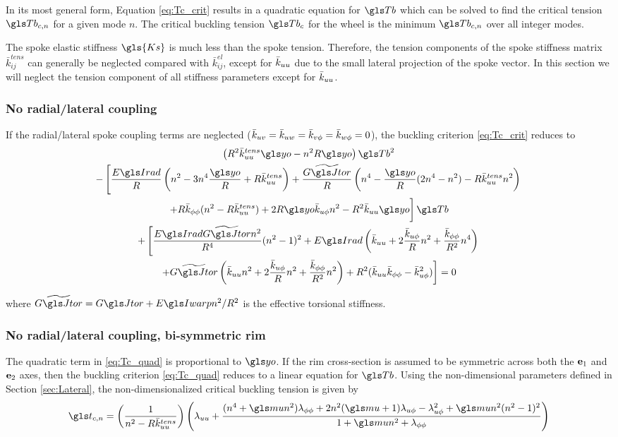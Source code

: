 \documentclass[\rootdir/thesis.tex]{subfiles}
\begin{document}
In its most general form, Equation \eqref{eq:Tc_crit} results in a quadratic equation for $\Tb$ which can be solved to find the critical tension $\Tb_{c,n}$ for a given mode $n$. The critical buckling tension $\Tb_c$ for the wheel is the minimum $\Tb_{c,n}$ over all integer modes.

The spoke elastic stiffness $\gls{Ks}$ is much less than the spoke tension. Therefore, the tension components of the spoke stiffness matrix $\bar{k}_{ij}^{tens}$ can generally be neglected compared with $\bar{k}_{ij}^{el}$, except for $\bar{k}_{uu}$ due to the small lateral projection of the spoke vector. In this section we will neglect the tension component of all stiffness parameters except for $\bar{k}_{uu}$.

\subsubsection*{No radial/lateral coupling}
If the radial/lateral spoke coupling terms are neglected ($\bar{k}_{uv}=\bar{k}_{uw}=\bar{k}_{v\phi}=\bar{k}_{w\phi}=0$), the buckling criterion \eqref{eq:Tc_crit} reduces to
\begin{multline}
\label{eq:Tc_quad}
\left(R^2\kuu^{tens}\yo - n^2R\yo \right)\Tb^2\\
-\left[\frac{\EIr}{R}\left(n^2 - 3n^4 \frac{\yo}{R} + R\kuu^{tens}\right)
       +\frac{\widetilde{\GJ}}{R}\left(n^4 - \frac{\yo}{R}(2n^4 - n^2) - R\kuu^{tens}n^2\right) \right.\\
       \left. +R\kpp (n^2 - R\kuu^{tens}) + 2R\yo\kup n^2 - R^2\kuu \yo \vphantom{\frac12} \right]\Tb\\
+\left[\frac{\EIr \widetilde{\GJ} n^2}{R^4}(n^2-1)^2
       +\EIr\left(\kuu + 2\frac{\kup}{R}n^2 + \frac{\kpp}{R^2}n^4\right) \right.\\
       \left. +\widetilde{\GJ}\left(\kuu n^2 + 2\frac{\kup}{R}n^2 + \frac{\kpp}{R^2}n^2\right)
       +R^2(\kuu\kpp - \kup^2)\right] = 0
\end{multline}

where $\widetilde{\GJ} = \GJ + \EIw n^2/R^2$ is the effective torsional stiffness.

\subsubsection*{No radial/lateral coupling, bi-symmetric rim}
The quadratic term in \eqref{eq:Tc_quad} is proportional to $\yo$. If the rim cross-section is assumed to be symmetric across both the $\mathbf{e}_1$ and $\mathbf{e}_2$ axes, then the buckling criterion \eqref{eq:Tc_quad} reduces to a linear equation for $\Tb$. Using the non-dimensional parameters defined in Section \ref{sec:Lateral}, the non-dimensionalized critical buckling tension is given by
\begin{equation}
\label{eq:Tcn_lin}
\ts_{c,n} = \left(\frac{1}{n^2 - R\kuu^{tens}}\right)
\left(\lr_{uu}
      +\frac{(n^4 + \m n^2)\lr_{\phi\phi}
             +2n^2(\m + 1)\lr_{u\phi} - \lr_{u\phi}^2
             +\m n^2(n^2-1)^2}
        {1 + \m n^2 + \lr_{\phi\phi}}\right)
\end{equation}
\end{document}
